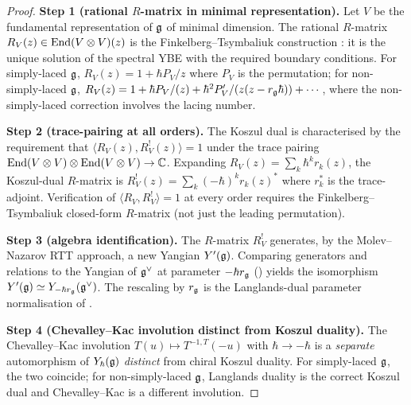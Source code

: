 \begin{proof}
\textbf{Step 1 (rational $R$-matrix in minimal representation).} Let
$V$ be the fundamental representation of $\mathfrak{g}$ of minimal dimension.
The rational $R$-matrix $R_V(z)\in \mathrm{End}(V\otimes V)(z)$ is the
Finkelberg--Tsymbaliuk construction \cite{FinkelbergTsymbaliuk20}: it
is the unique solution of the spectral YBE with the required boundary
conditions. For simply-laced $\mathfrak{g}$, $R_V(z) = 1 + \hbar P_V/z$ where
$P_V$ is the permutation; for non-simply-laced $\mathfrak{g}$, $R_V(z) = 1 + \hbar
P_V/(z) + \hbar^2 P'_V/(z(z - r_{\mathfrak{g}}\hbar)) + \cdots$, where the
non-simply-laced correction involves the lacing number.

\textbf{Step 2 (trace-pairing at all orders).} The Koszul dual is
characterised by the requirement that
$\langle R_V(z), R_V^{!}(z)\rangle = 1$ under the trace pairing
$\mathrm{End}(V\otimes V) \otimes \mathrm{End}(V\otimes V)\to \mathbb{C}$. Expanding
$R_V(z) = \sum_k \hbar^k r_k(z)$, the Koszul-dual $R$-matrix is
$R_V^{!}(z) = \sum_k (-\hbar)^k r_k(z)^{*}$ where $r_k^{*}$ is the
trace-adjoint. Verification of
$\langle R_V, R_V^{!}\rangle = 1$ at every order requires the
Finkelberg--Tsymbaliuk closed-form $R$-matrix (not just the
leading permutation).

\textbf{Step 3 (algebra identification).} The $R$-matrix $R_V^{!}$
generates, by the Molev--Nazarov RTT approach, a new Yangian
$Y'(\mathfrak{g})$. Comparing generators and relations to the Yangian of
$\mathfrak{g}^{\vee}$ at parameter $-\hbar r_{\mathfrak{g}}$ (\cite{GuayWendlandt18})
yields the isomorphism $Y'(\mathfrak{g}) \simeq Y_{-\hbar r_{\mathfrak{g}}}(\mathfrak{g}^{\vee})$.
The rescaling by $r_{\mathfrak{g}}$ is the Langlands-dual parameter
normalisation of \cite{FrenkelHernandez09}.

\textbf{Step 4 (Chevalley--Kac involution distinct from Koszul duality).} The
Chevalley--Kac involution $T(u)\mapsto T^{-1,T}(-u)$ with
$\hbar\to -\hbar$ is a \emph{separate} automorphism of $Y_{\hbar}(\mathfrak{g})$
\emph{distinct} from chiral Koszul duality. For simply-laced $\mathfrak{g}$,
the two coincide; for non-simply-laced $\mathfrak{g}$, Langlands duality is the
correct Koszul dual and Chevalley--Kac is a different involution.
\end{proof}

